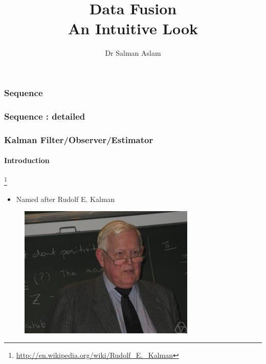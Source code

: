 

\usepackage{listings}
\title{Data Fusion\\
An Intuitive Look}  
\author{Dr Salman Aslam}
\date{} 




\begin{frame}[plain]
\vspace{0.8in}
\titlepage
\end{frame}

\begin{frame}[plain]\mypagenumwhite\Large
\frametitle{\textbf{Sequence}}
\setcounter{tocdepth}{1}
\tableofcontents
\end{frame} 

\begin{frame}[plain]\mypagenumwhite\small
\frametitle{\textbf{Sequence : detailed}}
\setcounter{tocdepth}{2}
\tableofcontents%
\end{frame} 



	
	\makeatletter
  \newcommand\tinyvvv{\@setfontsize\tinyvvv{0.5pt}{0.5}}
\makeatother


\begin{frame}
\frametitle{Kalman Filter/Observer/Estimator}
\framesubtitle{Introduction}

\footnote{\tiny\hspace{-0.23in} \href{http://en.wikipedia.org/wiki/Rudolf_E._Kalman}{http://en.wikipedia.org/wiki/Rudolf\_E.\_Kalman}}
\scriptsize
\begin{itemize}
\item Named after Rudolf E. Kalman
\end{itemize}
\begin{figure}[h]
\centering
\includegraphics[width=0.75\textwidth]{figs/CONTROLS_portrait_RudolfKalman.jpg}
\end{figure}
\end{frame}


